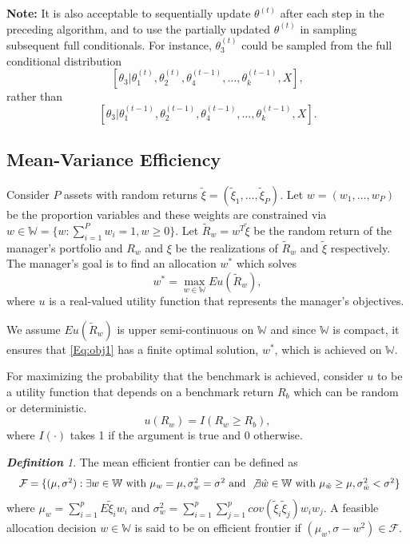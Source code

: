 \documentclass[12pt,oneside,a4paper]{book}
\theoremstyle{definition}
\theoremstyle{remark}
\newtheorem{defn}{\bf Definition}[subsection]
\begin{document}
					\textbf{Note:} It is also acceptable to sequentially update $\theta^{(t)}$ after each step in the preceding algorithm, and to use the partially updated $\theta^{(t)}$ in sampling subsequent full conditionals. For instance, $\theta^{(t)}_3$ could be sampled from the full conditional distribution
					\[
						[\theta_3|\theta_1^{(t)},\theta_2^{(t)},\theta_4^{(t-1)},\dots,\theta_k^{(t-1)},X],
					\]rather than
					\[
						[\theta_3|\theta_1^{(t-1)},\theta_2^{(t-1)},\theta_4^{(t-1)},\dots,\theta_k^{(t-1)},X].
					\]


			\subsection{Mean-Variance Efficiency}
				Consider $P$ assets with random returns $\tilde{\xi} = (\tilde{\xi}_1,\dots,\tilde{\xi}_P)$. Let $w=(w_1,\dots,w_P)$ be the proportion variables and these weights are constrained via $w\in \mathbb{W}= \{w:\sum_{i=1}^{P}w_i=1,w\ge 0\}$.
				Let $\tilde{R}_w = w^T\tilde{\xi}$ be the random return of the manager's portfolio and $R_w$ and $\xi$ be the realizations of $\tilde{R}_w$ and $\tilde{\xi}$ respectively.
				The manager's goal is to find an allocation $w^*$ which solves
				\begin{equation}\label{Eq:obj1}
					w^* = \max_{w\in\mathbb{W}	} Eu(\tilde{R}_w),
				\end{equation}
				where $u$ is a real-valued utility function that represents the manager's objectives.

				We assume $Eu(\tilde{R}_w)$ is upper semi-continuous on $\mathbb{W}$ and since $\mathbb{W}$ is compact, it ensures that \eqref{Eq:obj1} has a finite optimal solution, $w^*$, which is achieved on $\mathbb{W}$.

				For maximizing the probability that the benchmark is achieved, consider $u$ to be a utility function that depends on a benchmark return $R_b$ which can be random or deterministic.
				\begin{equation}\label{Eq:utilfunc}
					u(R_w) = I(R_w \ge R_b),
				\end{equation}
				where $I(\cdot)$ takes 1 if the argument is true and 0 otherwise.
				\begin{defn}\label{dfn:mean-var}
					The mean efficient frontier can be defined as
					\begin{equation*}\label{Eq:mean-eff}
						\resizebox{\hsize}{!}{
							$\mathcal{F} = \{
							(\mu,\sigma^2) :
							\exists w\in \mathbb{W} \text{ with }  \mu_w=\mu, \sigma_w^2=\sigma^2 \text{ and }
							\not\exists \hat{w}\in \mathbb{W} \text{ with }  \mu_{\hat{w}} \ge \mu, \sigma_{\hat{w}}^2 < \sigma^2
							\}
							$}
					\end{equation*} where $\mu_w = \sum_{i=1}^{p}E\tilde{\xi}_i w_i$ and $\sigma_w^2 = \sum_{i=1}^{p}\sum_{j=1}^{p} cov(\tilde{\xi}_i \tilde{\xi}_j)w_i w_j$.
					A feasible allocation decision $w\in\mathbb{W}$ is said to be on efficient frontier if $(\mu_w,\sigma-w^2) \in \mathcal{F}$.
				\end{defn}
\end{document}
